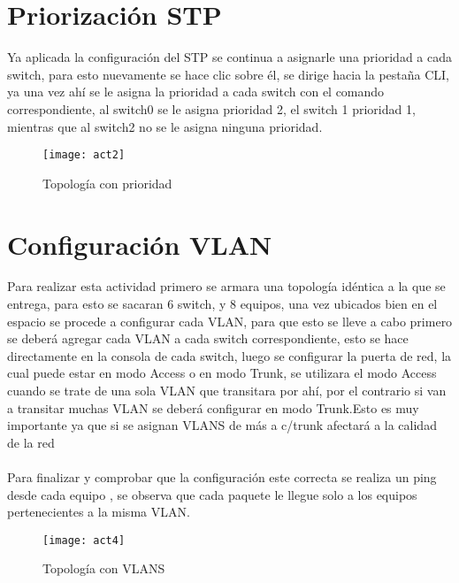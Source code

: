 \documentclass{udpreport}
\begin{document}
	\section{Priorización STP}
	   
	    Ya aplicada la configuración del STP se continua a asignarle una prioridad a cada switch,  para esto nuevamente se hace clic	sobre él, se dirige hacia la pestaña CLI, ya una vez ahí se le asigna la prioridad a cada switch con el comando correspondiente, al switch0 se le asigna prioridad 2, el switch 1 prioridad 1, mientras que al switch2 no se le asigna ninguna prioridad.
	    
        \begin{figure}[H]
	\centering
	\texttt{[image: act2]}
	\caption{Topología con prioridad}
	\end{figure}
	\vfill 

	\section{Configuración VLAN}
	    Para realizar esta actividad primero se armara una topología idéntica a la que se entrega, para esto se sacaran 6 switch, y 8 equipos, una vez ubicados bien en el espacio se procede a configurar cada VLAN, para que esto se lleve a cabo primero se deberá agregar cada VLAN a cada switch correspondiente, esto se hace directamente en la consola de cada switch, luego se configurar la puerta de red, la cual puede estar en modo Access o en modo Trunk, se utilizara el modo Access cuando se trate de una sola VLAN que transitara por ahí, por el contrario si van a transitar muchas VLAN se deberá configurar en modo Trunk.Esto es muy importante ya que si se asignan VLANS de más a c/trunk afectará a la calidad de la red\\\\
    Para finalizar y comprobar que la configuración este correcta se realiza un ping desde cada equipo , se observa que cada
	paquete le llegue solo a los equipos pertenecientes a la misma VLAN.\\
	
	\begin{figure}[H]
	\centering
	\texttt{[image: act4]}
	\caption{Topología con VLANS}
	\end{figure}\\	
	
\end{document}
